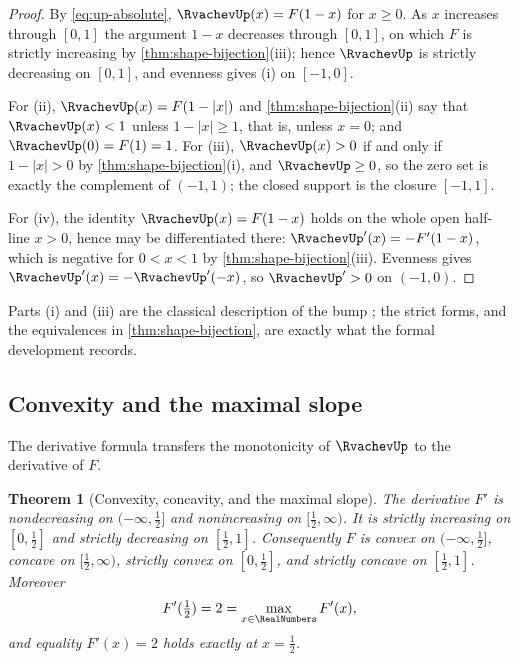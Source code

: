 \documentclass[11pt,oneside]{article}
\newtheorem{theorem}{Theorem}[section]
\theoremstyle{definition}
\theoremstyle{remark}
\begin{document}
\begin{proof}
By \eqref{eq:up-absolute}, $\RvachevUp(x)=F(1-x)$ for $x\ge0$.  As $x$ increases through $[0,1]$ the
argument $1-x$ decreases through $[0,1]$, on which $F$ is strictly increasing by
\cref{thm:shape-bijection}(iii); hence $\RvachevUp$ is strictly decreasing on $[0,1]$, and evenness
gives (i) on $[-1,0]$.

For (ii), $\RvachevUp(x)=F(1-|x|)$ and \cref{thm:shape-bijection}(ii) say that $\RvachevUp(x)<1$ unless
$1-|x|\ge1$, that is, unless $x=0$; and $\RvachevUp(0)=F(1)=1$.  For (iii), $\RvachevUp(x)>0$ if and only
if $1-|x|>0$ by \cref{thm:shape-bijection}(i), and $\RvachevUp\ge0$, so the zero set is exactly the
complement of $(-1,1)$; the closed support is the closure $[-1,1]$.

For (iv), the identity $\RvachevUp(x)=F(1-x)$ holds on the whole open half-line $x>0$, hence may be
differentiated there: $\RvachevUp'(x)=-F'(1-x)$, which is negative for $0<x<1$ by
\cref{thm:shape-bijection}(iii).  Evenness gives $\RvachevUp'(x)=-\RvachevUp'(-x)$, so $\RvachevUp'>0$ on
$(-1,0)$.
\end{proof}

Parts (i) and (iii) are the classical description of the bump \cite{rvachev1990,arias1982};
the strict forms, and the equivalences in \cref{thm:shape-bijection}, are exactly what the
formal development records.

\subsection{Convexity and the maximal slope}
\label{shape:convexity}

The derivative formula transfers the monotonicity of \(\RvachevUp\) to the derivative of \(F\).

\begin{theorem}[Convexity, concavity, and the maximal slope]
\label{thm:shape-convexity}
The derivative \(F'\) is nondecreasing on \((-\infty,\tfrac12]\) and nonincreasing on
\([\tfrac12,\infty)\).  It is strictly increasing on \([0,\tfrac12]\) and strictly decreasing
on \([\tfrac12,1]\).  Consequently \(F\) is convex on
\((-\infty,\tfrac12]\), concave on \([\tfrac12,\infty)\), strictly convex on
\([0,\tfrac12]\), and strictly concave on \([\tfrac12,1]\).  Moreover
\begin{equation}
 F'(\tfrac12)=2=\max_{x\in\RealNumbers}F'(x),                       \label{eq:shape-max-slope}
\end{equation}
and equality \(F'(x)=2\) holds exactly at \(x=\tfrac12\).
\end{theorem}
\end{document}
